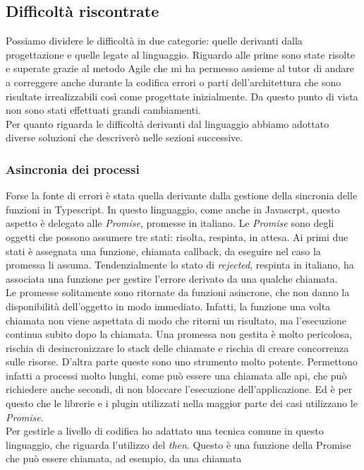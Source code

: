 \subsection{Difficoltà riscontrate}
Possiamo dividere le difficoltà in due categorie: quelle derivanti dalla progettazione e quelle legate al linguaggio.
Riguardo alle prime sono state risolte e superate grazie al metodo \gls{Agile} che mi ha permesso assieme al tutor di
andare a correggere anche durante la codifica errori o parti dell'architettura che sono risultate irrealizzabili così
come progettate inizialmente. Da questo punto di vista non sono stati effettuati grandi cambiamenti. \\
Per quanto riguarda le difficoltà derivanti dal linguaggio abbiamo adottato diverse soluzioni che descriverò nelle
sezioni successive.
\subsubsection{Asincronia dei processi}
Forse la fonte di errori è stata quella derivante dalla gestione della sincronia delle funzioni in Typescript. In questo
linguaggio, come anche in Javascrpt, questo aspetto è delegato alle \textit{Promise}, promesse in italiano. Le
\textit{Promise} sono degli oggetti che possono assumere tre stati: risolta, respinta, in attesa. Ai primi due stati è
assegnata una funzione, chiamata callback, da eseguire nel caso la promessa li assuma. Tendenzialmente lo stato di
\textit{rejected}, respinta in italiano, ha associata una funzione per gestire l'errore derivato da una qualche
chiamata. \\ 
\noindent Le promesse solitamente sono ritornate da funzioni asincrone, che non danno la disponibilità dell'oggetto in
modo immediato. Infatti, la funzione una volta chiamata non viene aspettata di modo che ritorni un risultato, ma
l'esecuzione continua subito dopo la chiamata. Una promessa non gestita è molto pericolosa, rischia di desincronizzare 
lo stack delle chiamate e rischia di creare concorrenza sulle risorse. D'altra parte queste sono uno strumento molto
potente. Permettono infatti a processi molto lunghi, come può essere una chiamata alle \gls{api}, che può richiedere
anche secondi, di non bloccare l'esecuzione dell'applicazione. Ed è per questo che le librerie e i plugin utilizzati
nella maggior parte dei casi utilizzano le \textit{Promise}. \\
\noindent Per gestirle a livello di codifica ho adattato una tecnica comune in questo linguaggio, che riguarda
l'utilizzo del \textit{then}. Questo è una funzione della Promise che può essere chiamata, ad esempio, da una chiamata
